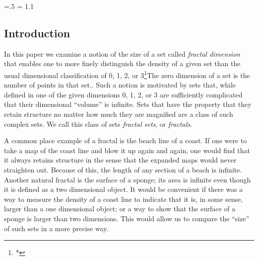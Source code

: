 


\def\dup{%
\setbox0=\hbox{\copy0 \kern\wd0 \copy0}}

\newcount \fcount
\newcount \fcountsponge


\def\fracaux{
\ifnum\fcount>0
\advance\fcount by-1
\dup
\fracaux \else \fi
}

\def\fractal#1#2{%
\setbox0=\hbox{\vrule height1pt width #2pt}
\offinterlineskip
\fcount=#1
\fracaux
\vbox{\copy0}}


\def\tri{%
\setbox0=\vbox{\hbox{\kern.5\wd0\copy0}\hbox{\copy0\copy0}}
}

\newcount \fcount

\def\fracrepstep{
\ifnum\fcountsponge>0
\advance\fcountsponge by-1
\tri
\fracrepstep
\else
\fi
}

\def\fsponge#1{%
\setbox0=\hbox{\vrule height1pt width1pt \kern1pt}
\offinterlineskip
\fcountsponge=#1
\fracrepstep
\vbox{\copy0}}




\parindent=0pt
\parskip=.5\baselineskip
\baselineskip = 1.1\baselineskip

\subsection{Introduction}
In this paper we examine a notion of the size of a set called 
{\it fractal dimension} that enables one to more
finely distinguish the density of a given set than the usual
dimensional classification of 0, 1, 2, or 
{\parindent=0pt
3\footnote{*}{The zero dimension of a set is the number of points in
that set.}}. Such a notion is 
motivated by sets that, while defined in one of the given
dimensions 0, 1, 2, or 3 are sufficiently
complicated that their dimensional ``volume'' is infinite. 
Sets that have
the property that they retain structure no matter how much they are
magnified are a class of such complex sets. We call this class of sets
{\it fractal sets}, or
{\it fractals}. 

A common place example of a fractal is the beach line of
a coast. If one were to take a map of the coast line and blow it up
again and again, one would find that it always retains structure in the
sense that the expanded maps would never straighten out.
Because of this, the length of any section of a beach is
infinite. Another natural fractal is the surface of a sponge; its area is
infinite even though it is defined as a two dimensional object. 
It would be convenient if there was a way to
measure the density of a coast line to
indicate that it is, in some sense, larger than a one dimensional
object; or a way to show that the surface of a sponge is larger than
two dimensions. This would allow us to compare the ``size'' of such sets
in a more precise way.

